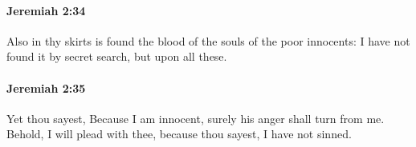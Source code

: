 		\paragraph{Jeremiah 2:34} %
			\label{JEREMIAH-2-34}

			Also in thy skirts is found the blood of the souls of the poor innocents: I have not found it by secret search, but upon all these.


		\paragraph{Jeremiah 2:35} %
			\label{JEREMIAH-2-35}

			Yet thou sayest, Because I am innocent, surely his anger shall turn from me. Behold, I will plead with thee, because thou sayest, I have not sinned.


